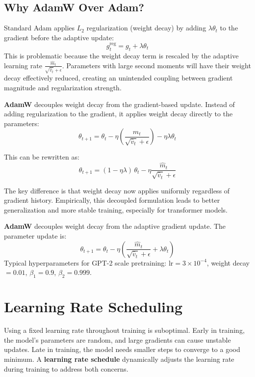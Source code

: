 \subsection{Why AdamW Over Adam?}

Standard Adam applies $L_2$ regularization (weight decay) by adding $\lambda \theta_t$ to the gradient before the adaptive update:
\[
  g_t^{\text{reg}} = g_t + \lambda \theta_t
\]
This is problematic because the weight decay term is rescaled by the adaptive learning rate $\frac{\hat{m}_t}{\sqrt{\hat{v}_t} + \epsilon}$. Parameters with large second moments will have their weight decay effectively reduced, creating an unintended coupling between gradient magnitude and regularization strength.

\textbf{AdamW} decouples weight decay from the gradient-based update. Instead of adding regularization to the gradient, it applies weight decay directly to the parameters:
\[
  \theta_{t+1} = \theta_t - \eta\left(\frac{\hat{m}_t}{\sqrt{\hat{v}_t} + \epsilon}\right) - \eta \lambda \theta_t
\]

This can be rewritten as:
\[
  \theta_{t+1} = (1 - \eta \lambda)\,\theta_t - \eta \frac{\hat{m}_t}{\sqrt{\hat{v}_t} + \epsilon}
\]

The key difference is that weight decay now applies uniformly regardless of gradient history. Empirically, this decoupled formulation leads to better generalization and more stable training, especially for transformer models.

\begin{keyconcept}
  \textbf{AdamW} decouples weight decay from the adaptive gradient update. The parameter update is:
  \[
    \theta_{t+1} = \theta_t - \eta\left(\frac{\hat{m}_t}{\sqrt{\hat{v}_t} + \epsilon} + \lambda \theta_t\right)
  \]
  Typical hyperparameters for GPT-2 scale pretraining: $\text{lr} = 3 \times 10^{-4}$, weight decay $= 0.01$, $\beta_1 = 0.9$, $\beta_2 = 0.999$.
\end{keyconcept}

\section{Learning Rate Scheduling}

Using a fixed learning rate throughout training is suboptimal. Early in training, the model's parameters are random, and large gradients can cause unstable updates. Late in training, the model needs smaller steps to converge to a good minimum. A \textbf{learning rate schedule} dynamically adjusts the learning rate during training to address both concerns.

